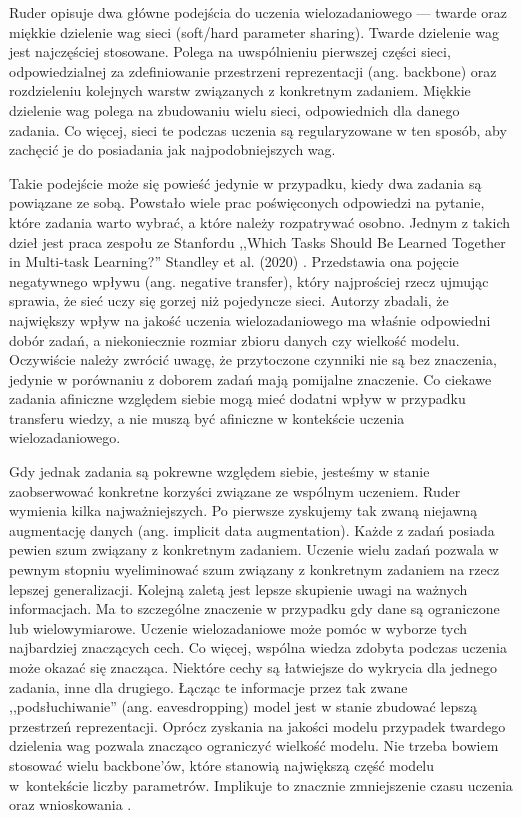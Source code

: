 Ruder opisuje dwa główne podejścia do uczenia wielozadaniowego — twarde oraz miękkie dzielenie wag sieci (soft/hard parameter sharing). Twarde dzielenie wag jest najczęściej stosowane. Polega na uwspólnieniu pierwszej części sieci, odpowiedzialnej za zdefiniowanie przestrzeni reprezentacji (ang. backbone) oraz rozdzieleniu kolejnych warstw związanych z konkretnym zadaniem. Miękkie dzielenie wag polega na zbudowaniu wielu sieci, odpowiednich dla danego zadania. Co więcej, sieci te podczas uczenia są regularyzowane w ten sposób, aby zachęcić je do posiadania jak najpodobniejszych wag.

Takie podejście może się powieść jedynie w przypadku, kiedy dwa zadania są powiązane ze sobą. Powstało wiele prac poświęconych odpowiedzi na pytanie, które zadania warto wybrać, a które należy rozpatrywać osobno. Jednym z takich dzieł jest praca zespołu ze Stanfordu ,,Which Tasks Should Be Learned Together in Multi-task Learning?'' Standley et al. (2020) \cite{standley2020tasks}. Przedstawia ona pojęcie negatywnego wpływu (ang. negative transfer), który najprościej rzecz ujmując sprawia, że sieć uczy się gorzej niż pojedyncze sieci. Autorzy zbadali, że największy wpływ na jakość uczenia wielozadaniowego ma właśnie odpowiedni dobór zadań, a niekoniecznie rozmiar zbioru danych czy wielkość modelu. Oczywiście należy zwrócić uwagę, że przytoczone czynniki nie są bez znaczenia, jedynie w porównaniu z doborem zadań mają pomijalne znaczenie. Co ciekawe zadania afiniczne względem siebie mogą mieć dodatni wpływ w przypadku transferu wiedzy, a nie muszą być afiniczne w kontekście uczenia wielozadaniowego.

Gdy jednak zadania są pokrewne względem siebie, jesteśmy w stanie zaobserwować konkretne korzyści związane ze wspólnym uczeniem. Ruder wymienia kilka najważniejszych. Po pierwsze zyskujemy tak zwaną niejawną augmentację danych (ang. implicit data augmentation). Każde z zadań posiada pewien szum związany z konkretnym zadaniem. Uczenie wielu zadań pozwala w pewnym stopniu wyeliminować szum związany z konkretnym zadaniem na rzecz lepszej generalizacji. Kolejną zaletą jest lepsze skupienie uwagi na ważnych informacjach. Ma to szczególne znaczenie w przypadku gdy dane są ograniczone lub wielowymiarowe. Uczenie wielozadaniowe może pomóc w wyborze tych najbardziej znaczących cech. Co więcej, wspólna wiedza zdobyta podczas uczenia może okazać się znacząca. Niektóre cechy są łatwiejsze do wykrycia dla jednego zadania, inne dla drugiego. Łącząc te informacje przez tak zwane ,,podsłuchiwanie'' (ang. eavesdropping) model jest w stanie zbudować lepszą przestrzeń reprezentacji. Oprócz zyskania na jakości modelu przypadek twardego dzielenia wag pozwala znacząco ograniczyć wielkość modelu. Nie trzeba bowiem stosować wielu backbone'ów, które stanowią największą część modelu w~kontekście liczby parametrów. Implikuje to znacznie zmniejszenie czasu uczenia oraz wnioskowania \cite{standley2020tasks}.